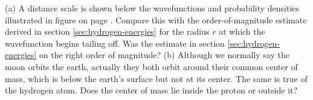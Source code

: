  (a) A distance scale is shown below the wavefunctions and
probability densities illustrated in figure
 on 
page \pageref{fig:hydrogen-three-states}. Compare
this with the order-of-magnitude estimate derived in section
\ref{sec:hydrogen-energies} for the radius $r$ at which the wavefunction begins
tailing off. Was the estimate in section \ref{sec:hydrogen-energies} on the right
order of magnitude?\hwendpart
 (b) Although we normally say the moon
orbits the earth, actually they both orbit around their
common center of mass, which is below the earth's surface
but not at its center. The same is true of the hydrogen
atom. Does the center of mass lie inside the proton or outside it?
